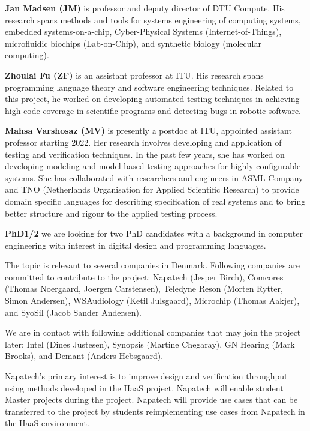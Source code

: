 \documentclass[fleqn,12pt]{article}
\begin{document}
{\bf Jan Madsen (JM)} is professor and deputy director of DTU Compute.
His research spans methods
and tools for systems engineering of computing systems, embedded systems-on-a-chip,
Cyber-Physical Systems (Internet-of-Things), microfluidic biochips (Lab-on-Chip), and
synthetic biology (molecular computing).

{\bf Zhoulai Fu (ZF)} is an assistant professor at ITU. His research
spans programming language theory and software engineering
techniques. Related to this project, he worked on developing automated
testing techniques in achieving high code coverage in scientific
programs and detecting bugs in robotic software.

{\bf Mahsa Varshosaz (MV)} is presently a postdoc at ITU, appointed assistant professor starting 2022. Her research involves developing and application of testing and verification techniques. In the past few years, she has worked on developing modeling and model-based testing approaches for highly configurable systems. She has collaborated with researchers and engineers in ASML Company and TNO (Netherlands Organisation for Applied Scientific Research) to provide domain specific languages for describing specification of real systems and to bring better structure and rigour to the applied testing process.


{\bf PhD1/2} we are looking for two PhD candidates with a background in computer engineering
with interest in digital design and programming languages.

The topic is relevant to several companies in Denmark. Following companies are committed to contribute to the project: Napatech (Jesper Birch), Comcores (Thomas Noergaard, Joergen Carstensen), Teledyne Reson (Morten Rytter, Simon Andersen), WSAudiology (Ketil Julsgaard), Microchip (Thomas Aakjer), and SyoSil (Jacob Sander Andersen).


We are in contact with following additional companies that may join the project later:
Intel (Dines Justesen), Synopsis (Martine Chegaray), GN Hearing (Mark Brooks), and Demant (Anders Hebsgaard).

Napatech's primary interest is to improve design and  verification throughput using methods developed in the HaaS project.
Napatech will enable student Master projects during the project.
Napatech will provide use cases that can be transferred to the project by students reimplementing use cases from Napatech in the HaaS environment.
\end{document}
